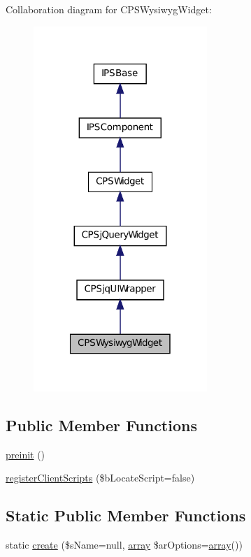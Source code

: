 Collaboration diagram for CPSWysiwygWidget:\nopagebreak
\begin{figure}[H]
\begin{center}
\leavevmode
\includegraphics[width=186pt]{classCPSWysiwygWidget__coll__graph}
\end{center}
\end{figure}
\subsection*{Public Member Functions}
\begin{DoxyCompactItemize}
\item 
\hyperlink{classCPSWysiwygWidget_a2dc262e99b1c246b56f27626bfe699ff}{preinit} ()
\item 
\hyperlink{classCPSWysiwygWidget_ac02a66bde8e72e4909137bf748edf665}{registerClientScripts} (\$bLocateScript=false)
\end{DoxyCompactItemize}
\subsection*{Static Public Member Functions}
\begin{DoxyCompactItemize}
\item 
static \hyperlink{classCPSWysiwygWidget_a0ffc269a208148ade57c7eb608a4562a}{create} (\$sName=null, \hyperlink{list_8php_aa3205d038c7f8feb5c9f01ac4dfadc88}{array} \$arOptions=\hyperlink{list_8php_aa3205d038c7f8feb5c9f01ac4dfadc88}{array}())
\end{DoxyCompactItemize}
